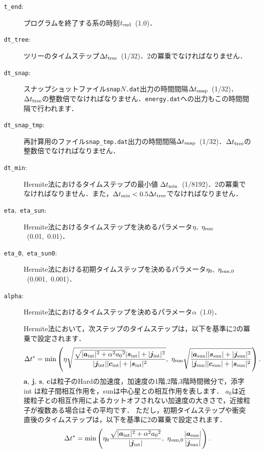 \documentclass[12pt,a4paper,dvipdfmx]{jsarticle}
\begin{document}
\begin{description}
\item[\texttt{t\_end}:]
プログラムを終了する系の時刻$t_{\rm end}$\ (1.0)．
\item[\texttt{dt\_tree}:]
ツリーのタイムステップ$\Delta t_{\rm tree}$\ (1/32)．2の冪乗でなければなりません．
\item[\texttt{dt\_snap}:]
 スナップショットファイル\texttt{snap}$N$\texttt{.dat}出力の時間間隔$\Delta t_{\rm snap}$\ (1/32)．$\Delta t_{\rm tree}$の整数倍でなければなりません．\texttt{energy.dat}への出力もこの時間間隔で行われます．
\item[\texttt{dt\_snap\_tmp}:]
再計算用のファイル\texttt{snap\_tmp.dat}出力の時間間隔$\Delta t_{\rm snap}$\ (1/32)．$\Delta t_{\rm tree}$の整数倍でなければなりません．
\item[\texttt{dt\_min}:]
Hermite法におけるタイムステップの最小値$\ \Delta t_{\rm min}$\ (1/8192)．2の冪乗でなければなりません．また，$\Delta t_{\rm min}<0.5\Delta t_{\rm tree}$でなければなりません．
\item[\texttt{eta},\ \texttt{eta\_sun}:]
Hermite法におけるタイムステップを決めるパラメータ$\eta,\ \eta_{\rm sun}$\ (0.01,\ 0.01)．
\item[\texttt{eta\_0},\ \texttt{eta\_sun0}:]
Hermite法における初期タイムステップを決めるパラメータ$\eta_{0},\ \eta_{\rm sun, 0}$\ (0.001,\ 0.001)．
\item[\texttt{alpha}:]
Hermite法におけるタイムステップを決めるパラメータ$\alpha$\ (1.0)．

Hermite法において，次ステップのタイムステップは，以下を基準に2の冪乗で設定されます．
\begin{equation}
\Delta t^{*} = \min\left(
\eta\sqrt{\frac{\sqrt{|\bm{a}_{\rm int}|^{2}+\alpha^{2}{a_{0}}^{2}}|\bm{s}_{\rm int}|+|\bm{j}_{\rm int}|^{2}}{|\bm{j}_{\rm int}||\bm{c}_{\rm int}|+|\bm{s}_{\rm int}|^{2}}},\ 
\eta_{\rm sun}\sqrt{\frac{|\bm{a}_{\rm sun}||\bm{s}_{\rm sun}|+|\bm{j}_{\rm sun}|^{2}}{|\bm{j}_{\rm sun}||\bm{c}_{\rm sun}|+|\bm{s}_{\rm sun}|^{2}}}
\right).
\end{equation}
$\bm{a},\ \bm{j},\ \bm{s},\ \bm{c}$は粒子のHardの加速度，加速度の1階,2階,3階時間微分で，添字 int は粒子間相互作用を，sunは中心星との相互作用を表します．
$a_{0}$は近接粒子との相互作用によるカットオフされない加速度の大きさで，近接粒子が複数ある場合はその平均です．
ただし，初期タイムステップや衝突直後のタイムステップは，以下を基準に2の冪乗で設定されます．
\begin{equation}
\Delta t^{*} = \min\left(
\eta_{0}\frac{\sqrt{|\bm{a}_{\rm int}|^{2}+\alpha^{2}{a_{0}}^{2}}}{|\bm{j}_{\rm int}|},\ 
\eta_{\rm sun, 0}\frac{|\bm{a}_{\rm sun}|}{|\bm{j}_{\rm sun}|}
\right).
\end{equation}


\end{description}
\end{document}
